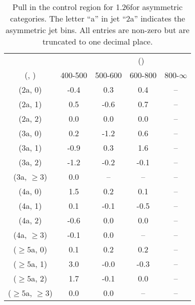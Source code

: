 \begin{table}[h!]
\tiny
\centering
\caption{Pull in the \gj control region for 1.26\ifb for asymmetric categories. The letter ``a'' in jet \eg ``2a''  indicates the asymmetric jet bins. All entries are non-zero but are truncated to one decimal place.\label{tab:pullsep_gj_ewk_asym}}
\begin{tabular}
{ccccc}
	\hline\hline
&	& \multicolumn{4}{c}{\scalht (\gev)} \\ 
	 (\njet,  \nb) & 400-500 & 500-600 & 600-800 & 800-$\infty$ \\ [0.8ex] 
\hline
	(2a, 0) & -0.4 & 0.3 & 0.4 & -- \\[0.5ex] 
	(2a, 1) & 0.5 & -0.6 & 0.7 & -- \\[0.5ex] 
	(2a, 2) & 0.0 & 0.0 & 0.0 & -- \\[0.5ex] 
	(3a, 0) & 0.2 & -1.2 & 0.6 & -- \\[0.5ex] 
	(3a, 1) & -0.9 & 0.3 & 1.6 & -- \\[0.5ex] 
	(3a, 2) & -1.2 & -0.2 & -0.1 & -- \\[0.5ex] 
	(3a, $\ge3$) & 0.0 & -- & -- & -- \\[0.5ex] 
	(4a, 0) & 1.5 & 0.2 & 0.1 & -- \\[0.5ex] 
	(4a, 1) & 0.1 & -0.1 & -0.5 & -- \\[0.5ex] 
	(4a, 2) & -0.6 & 0.0 & 0.0 & -- \\[0.5ex] 
	(4a, $\ge3$) & -0.1 & 0.0 & -- & -- \\[0.5ex] 
	($\ge5$a, 0) & 0.1 & 0.2 & 0.2 & -- \\[0.5ex] 
	($\ge5$a, 1) & 3.0 & -0.0 & -0.3 & -- \\[0.5ex] 
	($\ge5$a, 2) & 1.7 & -0.1 & 0.0 & -- \\[0.5ex] 
	($\ge5$a, $\ge3$) & 0.0 & 0.0 & -- & -- \\[0.5ex] 
	\hline
	\hline
\end{tabular}
\end{table}
